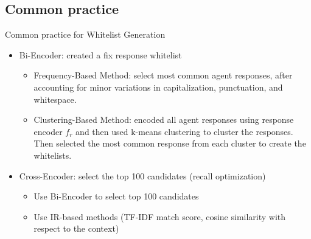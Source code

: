 \documentclass{beamer}
\begin{document}
\subsection{Common practice}
\begin{frame}{Common practice for Whitelist Generation}
    \begin{itemize}
        \item Bi-Encoder: created a fix response whitelist
        \begin{itemize}
            \item Frequency-Based Method: select most common agent responses, after accounting for minor variations in capitalization, punctuation, and whitespace.
            \item Clustering-Based Method: encoded all agent responses using response encoder $f_r$ and then used k-means clustering to cluster the responses. Then selected the most common response from each cluster to create the whitelists.
        \end{itemize}
        
        \item Cross-Encoder:  select the top 100 candidates (recall optimization)
        \begin{itemize}
            \item Use Bi-Encoder to select top 100 candidates
            \item Use IR-based methods (TF-IDF match score, cosine similarity with respect to the context)
        \end{itemize}
    \end{itemize}
\end{frame}
\end{document}

